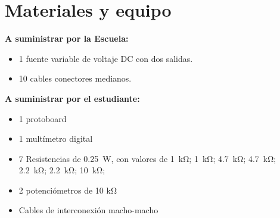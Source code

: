 \documentclass[12pt,letterpaper]{report}
\newcommand{\mat}{Materiales y equipo}
\begin{document}
\section{\mat}
\textbf{A suministrar por la Escuela:}
\begin{itemize}
\item 1 fuente variable de voltaje DC con dos salidas.
\item 10 cables conectores medianos.
\end{itemize}
\textbf{A suministrar por el estudiante:}
\begin{itemize} 
\item   1 protoboard
\item   1 multímetro digital
\item 7 Resistencias de \SI{0.25}{\watt}, con valores de \SI{1}{\kilo\ohm}; \SI{1}{\kilo\ohm}; \SI{4.7}{\kilo\ohm}; \SI{4.7}{\kilo\ohm}; \SI{2.2}{\kilo\ohm};
\SI{2.2}{\kilo\ohm};
\SI{10}{\kilo\ohm};
\item 2 potenciómetros de 10 \si{\kilo\ohm}
\item   Cables de interconexión macho-macho
\end{itemize}
\end{document}
